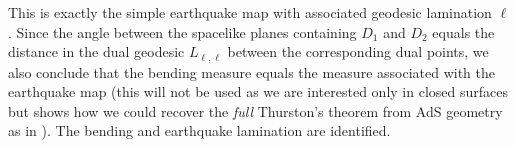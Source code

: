     This is exactly the simple earthquake map with associated geodesic lamination $\ell$. Since the angle between the spacelike planes containing $D_1$ and $D_2$ equals the distance in the dual geodesic $L_{\ell,\ell}$ between the corresponding dual points, we also conclude that the bending measure equals the measure associated with the earthquake map (this will not be used as we are interested only in closed surfaces but shows how we could recover the \textit{full} Thurston's theorem from AdS geometry as in \cite{benedetti2009canonical}). The bending and earthquake lamination are identified. 


